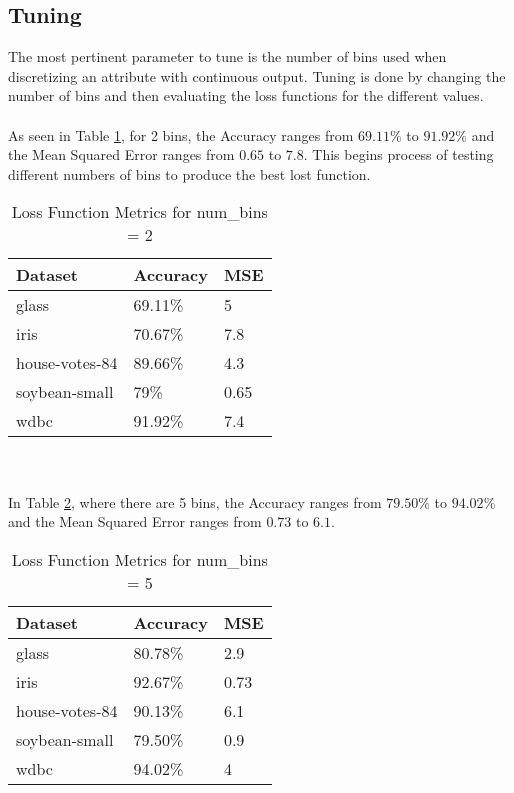 \documentclass[twoside,11pt]{article}
\begin{document}
\subsection{Tuning}

The most pertinent parameter to tune is the number of bins used when discretizing an attribute with continuous output.
Tuning is done by changing the number of bins and then evaluating the loss functions for the different values. \\\\
As seen in Table \ref{tab:metrics2}, for 2 bins, the Accuracy ranges from $69.11\%$ to $91.92\%$ and the Mean Squared Error ranges from $0.65$ to $7.8$. This begins process of testing different numbers of bins to produce the best lost function.
\begin{table}[h]
	\centering
	\caption{Loss Function Metrics for num\_bins = 2} \label{tab:metrics2}
	\begin{tabular}{|l|l|l|}
		\hline
		Dataset                  & Accuracy & MSE  \\ \hline
		glass                    & 69.11\%  & 5    \\ \hline
		iris                     & 70.67\%  & 7.8  \\ \hline
		house-votes-84           & 89.66\%  & 4.3  \\ \hline
		soybean-small            & 79\%     & 0.65 \\ \hline
		wdbc                     & 91.92\%  & 7.4  \\ \hline
	\end{tabular}
\end{table} \\\\
In Table \ref{tab:metrics5}, where there are 5 bins, the Accuracy ranges from $79.50\%$ to $94.02\%$ and the Mean Squared Error ranges from $0.73$ to $6.1$.
\begin{table}[h]
	\centering
	\caption{Loss Function Metrics for num\_bins = 5} \label{tab:metrics5}
	\begin{tabular}{|l|l|l|}
		\hline
		Dataset                  & Accuracy & MSE  \\ \hline
		glass                    & 80.78\%  & 2.9  \\ \hline
		iris                     & 92.67\%  & 0.73 \\ \hline
		house-votes-84           & 90.13\%  & 6.1  \\ \hline
		soybean-small            & 79.50\%  & 0.9  \\ \hline
		wdbc                     & 94.02\%  & 4    \\ \hline
	\end{tabular}
\end{table} \\\\
\end{document}
